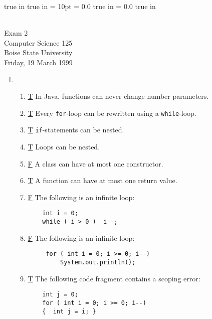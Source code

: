 \pagestyle{empty}
 true in
 true in
\topmargin = 10pt
\oddsidemargin = 0.0 true in
\evensidemargin = 0.0 true in
\newcommand{\ul}{\underline}
\newcommand{\spa}{\hspace{.25in}}


{\Large
\begin{center}
\mbox{ }
\vspace{.1in} \\
    Exam 2 \\
    Computer Science 125 \\ 
    Boise State University\\ 
    Friday, 19 March 1999
\end{center}
}

\begin{enumerate}

	\item
	\begin{enumerate}
	    \item \underline{T} In Java, functions can never change number parameters.
	    \item \underline{T} Every {\tt for}-loop can be rewritten using a {\tt while}-loop.
	    \item \underline{T} {\tt if}-statements can be nested.
	    \item \underline{T} Loops can be nested.
	    \item \underline{F} A class can have at most one constructor.
	    \item \underline{T} A function can have at most one return value.
	    \item \underline{F} The following is an infinite loop:
\begin{verbatim}    int i = 0; 
    while ( i > 0 )  i--;\end{verbatim}

	    \item \underline{F} The following is an infinite loop:
\begin{verbatim}     for ( int i = 0; i >= 0; i--) 
         System.out.println();\end{verbatim}

	    \item \underline{T} The following code fragment contains a scoping error:
\begin{verbatim}    int j = 0; 
    for ( int i = 0; i >= 0; i--) 
    {  int j = i; }\end{verbatim}	    


\end{enumerate}
\end{enumerate}
